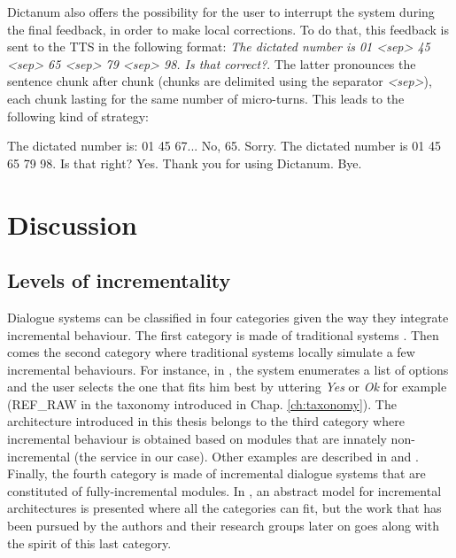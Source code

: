         Dictanum also offers the possibility for the user to interrupt the system during the final feedback, in order to make local corrections. To do that, this feedback is sent to the TTS in the following format: \textit{The dictated number is 01 <sep> 45 <sep> 65 <sep> 79 <sep> 98. Is that correct?}. The latter pronounces the sentence chunk after chunk (chunks are delimited using the separator \textit{<sep>}), each chunk lasting for the same number of micro-turns. This leads to the following kind of strategy:
        
        \begin{dialogue}
        	 The dictated number is: 01 45 67...
             No, 65.
             Sorry. The dictated number is 01 45 65 79 98. Is that right?
             Yes.
             Thank you for using Dictanum. Bye.
        \end{dialogue}
    
\section{Discussion}

	\subsection{Levels of incrementality}
    
    	Dialogue systems can be classified in four categories given the way they integrate incremental behaviour. The first category is made of traditional systems \cite{CLASSiCd64}. Then comes the second category where traditional systems locally simulate a few incremental behaviours. For instance, in \cite{El-Asri2014}, the system enumerates a list of options and the user selects the one that fits him best by uttering \textit{Yes} or \textit{Ok} for example (REF\_RAW in the taxonomy introduced in Chap. \ref{ch:taxonomy}). The architecture introduced in this thesis belongs to the third category where incremental behaviour is obtained based on modules that are innately non-incremental (the service in our case). Other examples are described in \cite{Selfridge2012a} and \cite{Hastie2013}. Finally, the fourth category is made of incremental dialogue systems that are constituted of fully-incremental modules. In \cite{Schlangen2011}, an abstract model for incremental architectures is presented where all the categories can fit, but the work that has been pursued by the authors and their research groups later on goes along with the spirit of this last category.
		

